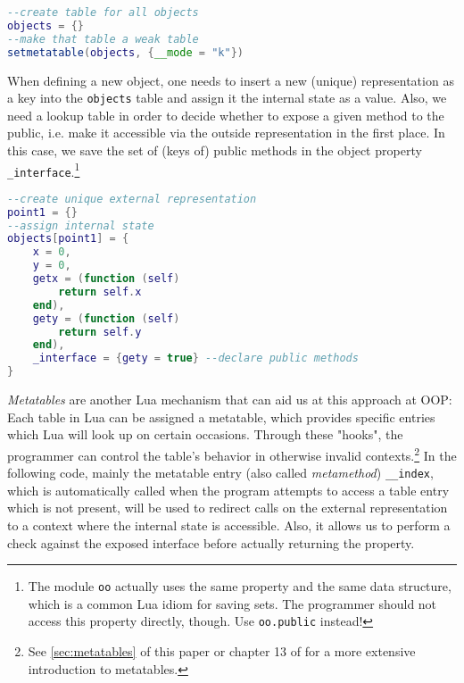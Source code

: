 \begin{lstlisting}[language=lua, caption={Defining a global weak table in order to list all objects in the progam}, label=lst:tab1, name=lst:tab]
--create table for all objects
objects = {}
--make that table a weak table
setmetatable(objects, {__mode = "k"})
\end{lstlisting}

When defining a new object, one needs to insert a new (unique) representation as a key into the \texttt{objects} table and assign it the internal state as a value. Also, we need a lookup table in order to decide whether to expose a given method to the public, i.e. make it accessible via the outside representation in the first place. In this case, we save the set of (keys of) public methods in the object property \texttt{\_interface}.\footnote{The module \texttt{oo} actually uses the same property and the same data structure, which is a common Lua idiom for saving sets. The programmer should not access this property directly, though. Use \texttt{oo.public} instead!}

\begin{lstlisting}[language=lua, caption={Possible implementation of a point object using a global weak table (continued froom listing \ref{lst:tab1})}, label=lst:tab2, name=lst:tab]
--create unique external representation
point1 = {}
--assign internal state
objects[point1] = {
	x = 0,
	y = 0,
	getx = (function (self)
		return self.x
	end),
	gety = (function (self)
		return self.y
	end),
	_interface = {gety = true} --declare public methods
}
\end{lstlisting}

\emph{Metatables} are another Lua mechanism that can aid us at this approach at OOP: Each table in Lua can be assigned a metatable, which provides specific entries which Lua will look up on certain occasions. Through these "hooks", the programmer can control the table's behavior in otherwise invalid contexts.\footnote{See \ref{sec:metatables} of this paper or chapter 13 of \cite{Ierusalimschy2006} for a more extensive introduction to metatables.} In the following code, mainly the metatable entry (also called \emph{metamethod}) \texttt{\_\_index}, which is automatically called when the program attempts to access a table entry which is not present, will be used to redirect calls on the external representation to a context where the internal state is accessible. Also, it allows us to perform a check against the exposed interface before actually returning the property.

